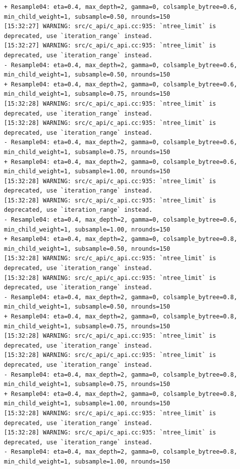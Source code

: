 \documentclass[
  letterpaper,
  DIV=11,
  numbers=noendperiod]{scrartcl}
\begin{document}
\begin{verbatim}
+ Resample04: eta=0.4, max_depth=2, gamma=0, colsample_bytree=0.6, min_child_weight=1, subsample=0.50, nrounds=150 
[15:32:27] WARNING: src/c_api/c_api.cc:935: `ntree_limit` is deprecated, use `iteration_range` instead.
[15:32:27] WARNING: src/c_api/c_api.cc:935: `ntree_limit` is deprecated, use `iteration_range` instead.
- Resample04: eta=0.4, max_depth=2, gamma=0, colsample_bytree=0.6, min_child_weight=1, subsample=0.50, nrounds=150 
+ Resample04: eta=0.4, max_depth=2, gamma=0, colsample_bytree=0.6, min_child_weight=1, subsample=0.75, nrounds=150 
[15:32:28] WARNING: src/c_api/c_api.cc:935: `ntree_limit` is deprecated, use `iteration_range` instead.
[15:32:28] WARNING: src/c_api/c_api.cc:935: `ntree_limit` is deprecated, use `iteration_range` instead.
- Resample04: eta=0.4, max_depth=2, gamma=0, colsample_bytree=0.6, min_child_weight=1, subsample=0.75, nrounds=150 
+ Resample04: eta=0.4, max_depth=2, gamma=0, colsample_bytree=0.6, min_child_weight=1, subsample=1.00, nrounds=150 
[15:32:28] WARNING: src/c_api/c_api.cc:935: `ntree_limit` is deprecated, use `iteration_range` instead.
[15:32:28] WARNING: src/c_api/c_api.cc:935: `ntree_limit` is deprecated, use `iteration_range` instead.
- Resample04: eta=0.4, max_depth=2, gamma=0, colsample_bytree=0.6, min_child_weight=1, subsample=1.00, nrounds=150 
+ Resample04: eta=0.4, max_depth=2, gamma=0, colsample_bytree=0.8, min_child_weight=1, subsample=0.50, nrounds=150 
[15:32:28] WARNING: src/c_api/c_api.cc:935: `ntree_limit` is deprecated, use `iteration_range` instead.
[15:32:28] WARNING: src/c_api/c_api.cc:935: `ntree_limit` is deprecated, use `iteration_range` instead.
- Resample04: eta=0.4, max_depth=2, gamma=0, colsample_bytree=0.8, min_child_weight=1, subsample=0.50, nrounds=150 
+ Resample04: eta=0.4, max_depth=2, gamma=0, colsample_bytree=0.8, min_child_weight=1, subsample=0.75, nrounds=150 
[15:32:28] WARNING: src/c_api/c_api.cc:935: `ntree_limit` is deprecated, use `iteration_range` instead.
[15:32:28] WARNING: src/c_api/c_api.cc:935: `ntree_limit` is deprecated, use `iteration_range` instead.
- Resample04: eta=0.4, max_depth=2, gamma=0, colsample_bytree=0.8, min_child_weight=1, subsample=0.75, nrounds=150 
+ Resample04: eta=0.4, max_depth=2, gamma=0, colsample_bytree=0.8, min_child_weight=1, subsample=1.00, nrounds=150 
[15:32:28] WARNING: src/c_api/c_api.cc:935: `ntree_limit` is deprecated, use `iteration_range` instead.
[15:32:28] WARNING: src/c_api/c_api.cc:935: `ntree_limit` is deprecated, use `iteration_range` instead.
- Resample04: eta=0.4, max_depth=2, gamma=0, colsample_bytree=0.8, min_child_weight=1, subsample=1.00, nrounds=150 

\end{verbatim}
\end{document}
